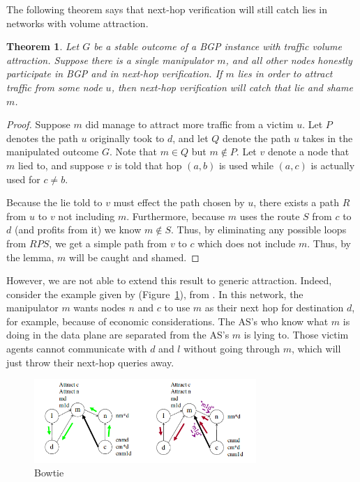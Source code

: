 \documentclass[10pt]{article}
\newtheorem{theorem}{Theorem}
\begin{document}
  The following theorem says that next-hop verification will still catch lies
  in networks with volume attraction.
  \begin{theorem}
    Let $G$ be a stable outcome of a BGP instance with traffic volume attraction.
    Suppose there is a single manipulator $m$,
    and all other nodes honestly participate in BGP and in next-hop verification.
    If $m$ lies in order to attract traffic from some node $u$,
    then next-hop verification will catch that lie and shame $m$.
  \end{theorem}
  \begin{proof}
    Suppose $m$ did manage to attract more traffic from a victim $u$.
    Let $P$ denotes the path $u$ originally took to $d$,
    and let $Q$ denote the path $u$ takes in the manipulated outcome $G$.
    Note that $m\in Q$ but $m\notin P$.
    Let $v$ denote a node that $m$ lied to, and suppose $v$ is told
    that hop $(a,b)$ is used while $(a,c)$ is actually used for $c\ne b$.

    Because the lie told to $v$ must effect the path chosen by $u$,
    there exists a path $R$ from $u$ to $v$ not including $m$.
    Furthermore, because $m$ uses the route $S$ from $c$ to $d$
    (and profits from it) we know $m\notin S$.
    Thus, by eliminating any possible loops from $RPS$,
    we get a simple path from $v$ to $c$ which does not include $m$.
    Thus, by the lemma, $m$ will be caught and shamed.
  \end{proof}

  However, we are not able to extend this result to generic attraction.
  Indeed, consider the example given by (Figure~\ref{fig:Bowtie}),
  from \cite{Attraction}.
  In this network, the manipulator $m$ wants nodes $n$ and $c$
  to use $m$ as their next hop for destination $d$,
  for example, because of economic considerations.
  The AS's who know what $m$ is doing in the data plane
  are separated from the AS's $m$ is lying to.
  Those victim agents cannot communicate with $d$ and $l$ without
  going through $m$, which will just throw their next-hop queries away.
  \begin{figure}[h]
    \centering
    \caption{Bowtie}\label{fig:Bowtie}
    \includegraphics[width=0.75\textwidth]{Bowtie}
  \end{figure}
\end{document}
